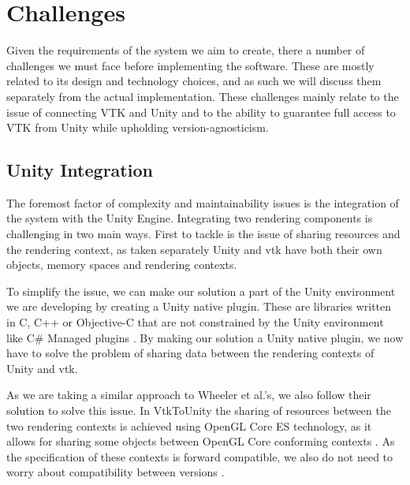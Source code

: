 \section{Challenges}

Given the requirements of the system we aim to create, there a number of challenges we must face before implementing the software. These are mostly related to its design and technology choices, and as such we will discuss them separately from the actual implementation. These challenges mainly relate to the issue of connecting VTK and Unity and to the ability to guarantee full access to VTK from Unity while upholding version-agnosticism.

\subsection{Unity Integration}

The foremost factor of complexity and maintainability issues is the integration of the system with the Unity Engine. Integrating two rendering components is challenging in two main ways. First to tackle is the issue of sharing resources and the rendering context, as taken separately Unity and \acrshort{vtk} have both their own objects, memory spaces and rendering contexts.

To simplify the issue, we can make our solution a part of the Unity environment we are developing by creating a Unity native plugin. These are libraries written in C, C++ or Objective-C that are not constrained by the Unity environment like C\# Managed plugins \cite{technologies_21AD}. By making our solution a Unity native plugin, we now have to solve the problem of sharing data between the rendering contexts of Unity and \acrshort{vtk}.

As we are taking a similar approach to Wheeler et al.'s, we also follow their solution to solve this issue. In VtkToUnity the sharing of resources between the two rendering contexts is achieved using OpenGL Core ES technology, as it allows for sharing some objects between OpenGL Core conforming contexts \cite{wheeler_virtual_2018}. As the specification of these contexts is forward compatible, we also do not need to worry about compatibility between versions \cite{khronos_opengl_2021}.

